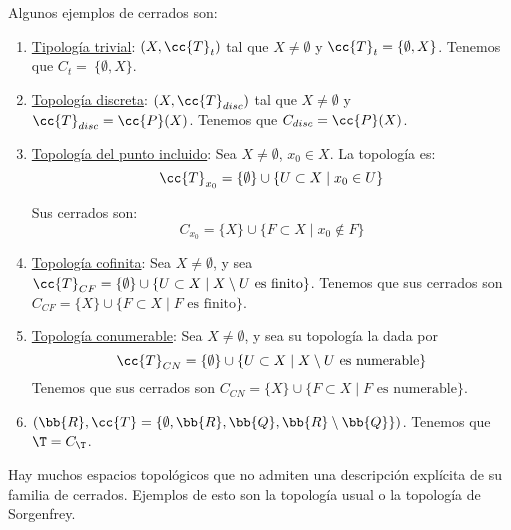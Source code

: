 \begin{ejemplo}
    Algunos ejemplos de cerrados son:
    \begin{enumerate}
        \item \ul{Tipología trivial}: $(X,\cc{T}_t)$ tal que $X\neq \emptyset$ y $\cc{T}_t=\{\emptyset, X\}$. Tenemos que $C_t=~\{\emptyset, X\}$.

        \item \ul{Topología discreta}: $(X,\cc{T}_{disc})$ tal que $X\neq \emptyset$ y $\cc{T}_{disc}=\cc{P}(X)$. Tenemos que $C_{disc}=\cc{P}(X)$.

        \item \ul{Topología del punto incluido}: Sea $X\neq \emptyset$, $x_0\in X$. La topología es:
        \begin{equation*}
            \cc{T}_{x_0}=\{\emptyset\}\cup \{U\subset X\mid x_0\in U\}
        \end{equation*}

        Sus cerrados son:
        \begin{equation*}
            C_{x_0}=\{X\}\cup \{F\subset X\mid x_0\notin F\}
        \end{equation*}

        \item \ul{Topología cofinita}: Sea $X\neq \emptyset$, y sea $\cc{T}_{CF}=\{\emptyset\}\cup \{U\subset X\mid X\setminus U \text{ es finito}\}$. Tenemos que sus cerrados son $C_{CF}=\{X\}\cup \{F\subset X\mid F \text{ es finito}\}$.

        \item \ul{Topología conumerable}: Sea $X\neq \emptyset$, y sea su topología la dada por $$\cc{T}_{CN}=\{\emptyset\}\cup \{U\subset X\mid X\setminus U \text{ es numerable}\}$$
        Tenemos que sus cerrados son $C_{CN}=\{X\}\cup \{F\subset X\mid F \text{ es numerable}\}$.

        \item $(\bb{R}, \cc{T}=\{\emptyset, \bb{R}, \bb{Q}, \bb{R}\setminus \bb{Q}\})$. Tenemos que $\T=C_\T$.
    \end{enumerate}
    Hay muchos espacios topológicos que no admiten una descripción explícita de su familia de cerrados. Ejemplos de esto son la topología usual o la topología de Sorgenfrey.
\end{ejemplo}


